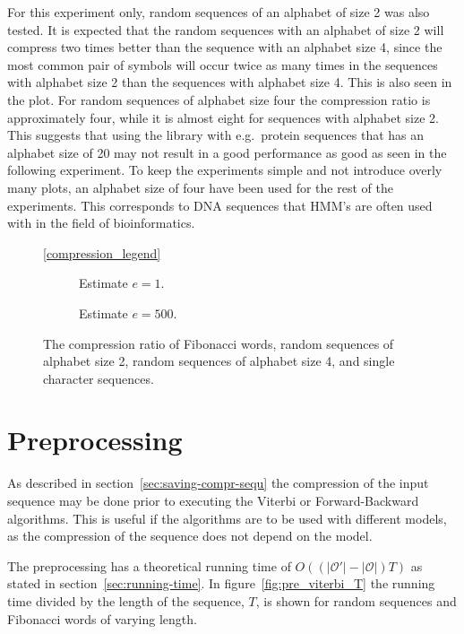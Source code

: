 For this experiment only, random sequences of an alphabet of size 2 was also
tested. It is expected that the random sequences with an alphabet of size 2
will compress two times better than the sequence with an alphabet size 4, since
the most common pair of symbols will occur twice as many times in the sequences
with alphabet size 2 than the sequences with alphabet size 4. This is also seen
in the plot. For random sequences of alphabet size four the compression ratio
is approximately four, while it is almost eight for sequences with alphabet
size 2. This suggests that using the library with e.g.\ protein sequences that
has an alphabet size of 20 may not result in a good performance as good as seen
in the following experiment. To keep the experiments simple and not introduce
overly many plots, an alphabet size of four have been used for the rest of the
experiments. This corresponds to DNA sequences that HMM's are often used with
in the field of bioinformatics.

\begin{figure}
  \centering\ref{compression_legend}
  \begin{subfigure}[b]{0.5\textwidth}
    \centering 
    \caption{Estimate $e = 1$.}
  \end{subfigure}%
  \begin{subfigure}[b]{0.5\textwidth}
    \centering 
    \caption{Estimate $e = 500$.}
  \end{subfigure}
  \caption{The compression ratio of Fibonacci words, random sequences of
    alphabet size 2, random sequences of alphabet size 4, and single character
    sequences.}
  \label{fig:compression_ratio}
\end{figure}

\section{Preprocessing}

As described in section~\ref{sec:saving-compr-sequ} the compression of the
input sequence may be done prior to executing the Viterbi or Forward-Backward
algorithms. This is useful if the algorithms are to be used with different
models, as the compression of the sequence does not depend on the model.

The preprocessing has a theoretical running time of
$O(( \lvert\mathcal{O'}\rvert - \lvert{\mathcal{O}}\rvert) T)$ as stated in
section~\ref{sec:running-time}. In figure~\ref{fig:pre_viterbi_T} the running
time divided by the length of the sequence, $T$, is shown for random sequences
and Fibonacci words of varying length.

